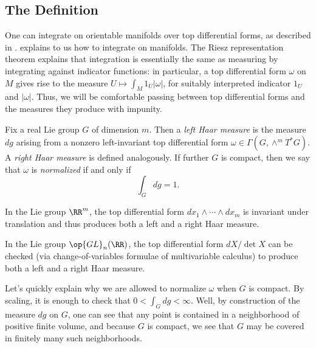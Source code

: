 \documentclass[notes.tex]{subfiles}
\begin{document}
\subsection{The Definition} \label{subsec:get-haar}
One can integrate on orientable manifolds over top differential forms, as described in \cite[Section~16.1]{lee-manifolds}.
 explains to us how to integrate on manifolds.
The Riesz representation theorem explains that integration is essentially the same as measuring by integrating against indicator functions: in particular, a top differential form $\omega$ on $M$ gives rise to the measure $U\mapsto\int_M1_U\left|\omega\right|$, for suitably interpreted indicator $1_U$ and $\left|\omega\right|$. Thus, we will be comfortable passing between top differential forms and the measures they produce with impunity.
\begin{definition}
	Fix a real Lie group $G$ of dimension $m$. Then a \textit{left Haar measure} is the measure $dg$ arising from a nonzero left-invariant top differential form $\omega\in\Gamma(G,\land^mT^*G)$. A \textit{right Haar measure} is defined analogously. If further $G$ is compact, then we say that $\omega$ is \textit{normalized} if and only if
	\[\int_Gdg=1.\]
\end{definition}
\begin{example} \label{ex:haar-rm}
	In the Lie group $\RR^m$, the top differential form $dx_1\land\cdots\land dx_m$ is invariant under translation and thus produces both a left and a right Haar measure.
\end{example}
\begin{example} \label{ex:haar-gl}
	In the Lie group $\op{GL}_n(\RR)$, the top differential form $dX/\det X$ can be checked (via change-of-variables formulae of multivariable calculus) to produce both a left and a right Haar measure.
\end{example}
\begin{remark}
	Let's quickly explain why we are allowed to normalize $\omega$ when $G$ is compact. By scaling, it is enough to check that $0<\int_Gdg<\infty$. Well, by construction of the measure $dg$ on $G$, one can see that any point is contained in a neighborhood of positive finite volume, and because $G$ is compact, we see that $G$ may be covered in finitely many such neighborhoods.
\end{remark}
\end{document}
